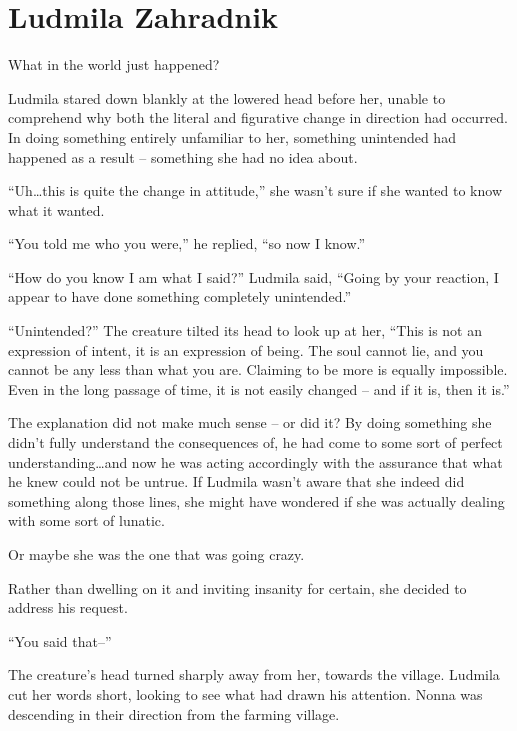 \chapter{Ludmila Zahradnik}

What in the world just happened?

 

Ludmila stared down blankly at the lowered head before her, unable to comprehend why both the literal and figurative change in direction had occurred. In doing something entirely unfamiliar to her, something unintended had happened as a result – something she had no idea about.

 

“Uh…this is quite the change in attitude,” she wasn’t sure if she wanted to know what it wanted.

 

“You told me who you were,” he replied, “so now I know.”

 

“How do you know I am what I said?” Ludmila said, “Going by your reaction, I appear to have done something completely unintended.”

 

“Unintended?” The creature tilted its head to look up at her, “This is not an expression of intent, it is an expression of being. The soul cannot lie, and you cannot be any less than what you are. Claiming to be more is equally impossible. Even in the long passage of time, it is not easily changed – and if it is, then it is.”

 

The explanation did not make much sense – or did it? By doing something she didn’t fully understand the consequences of, he had come to some sort of perfect understanding…and now he was acting accordingly with the assurance that what he knew could not be untrue. If Ludmila wasn’t aware that she indeed did something along those lines, she might have wondered if she was actually dealing with some sort of lunatic.

 

Or maybe she was the one that was going crazy.

 

Rather than dwelling on it and inviting insanity for certain, she decided to address his request.

 

“You said that–”

 

The creature’s head turned sharply away from her, towards the village. Ludmila cut her words short, looking to see what had drawn his attention. Nonna was descending in their direction from the farming village.

